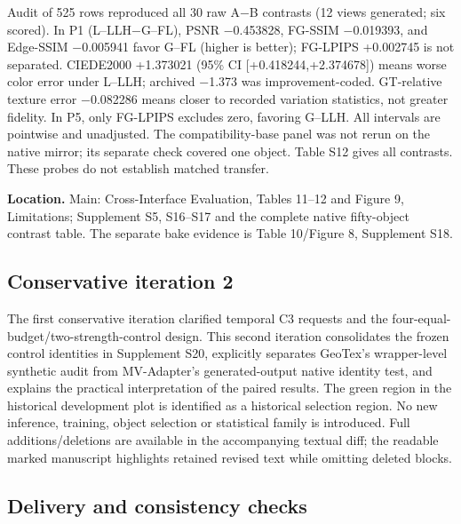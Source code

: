 \documentclass[
  10pt,
]{article}
\begin{document}
Audit of 525 rows reproduced all 30 raw A−B contrasts (12 views
generated; six scored). In P1 (L--LLH−G--FL), PSNR −0.453828, FG-SSIM
−0.019393, and Edge-SSIM −0.005941 favor G--FL (higher is better);
FG-LPIPS +0.002745 is not separated. CIEDE2000 +1.373021 (95\% CI
{[}+0.418244,+2.374678{]}) means worse color error under L--LLH;
archived −1.373 was improvement-coded. GT-relative texture error
−0.082286 means closer to recorded variation statistics, not greater
fidelity. In P5, only FG-LPIPS excludes zero, favoring G--LLH. All
intervals are pointwise and unadjusted. The compatibility-base panel was
not rerun on the native mirror; its separate check covered one object.
Table S12 gives all contrasts. These probes do not establish matched
transfer.

\textbf{Location.} Main: Cross-Interface Evaluation, Tables 11--12 and
Figure 9, Limitations; Supplement S5, S16--S17 and the complete native
fifty-object contrast table. The separate bake evidence is Table
10/Figure 8, Supplement S18.

\hypertarget{conservative-iteration-2}{%
\subsection{Conservative iteration 2}\label{conservative-iteration-2}}

The first conservative iteration clarified temporal C3 requests and the
four-equal-budget/two-strength-control design. This second iteration
consolidates the frozen control identities in Supplement S20, explicitly
separates GeoTex's wrapper-level synthetic audit from MV-Adapter's
generated-output native identity test, and explains the practical
interpretation of the paired results. The green region in the historical
development plot is identified as a historical selection region. No new
inference, training, object selection or statistical family is
introduced. Full additions/deletions are available in the accompanying
textual diff; the readable marked manuscript highlights retained revised
text while omitting deleted blocks.

\hypertarget{delivery-and-consistency-checks}{%
\subsection{Delivery and consistency
checks}\label{delivery-and-consistency-checks}}
\end{document}
